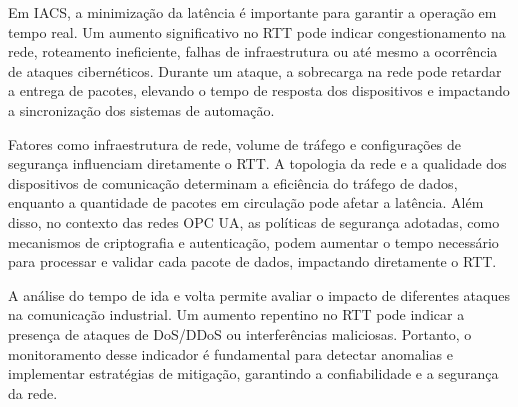         Em IACS, a minimização da latência é importante para garantir a operação em tempo real. Um aumento significativo no RTT pode indicar congestionamento na rede, roteamento ineficiente, falhas de infraestrutura ou até mesmo a ocorrência de ataques cibernéticos. Durante um ataque, a sobrecarga na rede pode retardar a entrega de pacotes, elevando o tempo de resposta dos dispositivos e impactando a sincronização dos sistemas de automação.
        
        Fatores como infraestrutura de rede, volume de tráfego e configurações de segurança influenciam diretamente o RTT. A topologia da rede e a qualidade dos dispositivos de comunicação determinam a eficiência do tráfego de dados, enquanto a quantidade de pacotes em circulação pode afetar a latência. Além disso, no contexto das redes  OPC UA, as políticas de segurança adotadas, como mecanismos de criptografia e autenticação, podem aumentar o tempo necessário para processar e validar cada pacote de dados, impactando diretamente o RTT.
        
        A análise do  tempo de ida e volta permite avaliar o impacto de diferentes ataques na comunicação industrial. Um aumento repentino no RTT pode indicar a presença de ataques de DoS/DDoS ou interferências maliciosas. Portanto, o monitoramento desse indicador é fundamental para detectar anomalias e implementar estratégias de mitigação, garantindo a confiabilidade e a segurança da rede.


        
        
